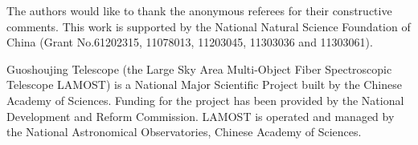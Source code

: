 \documentclass[manuscript]{aastex}
\begin{document}


\acknowledgments

The authors would like to thank the anonymous referees for their constructive comments.
This work is supported by the National Natural Science Foundation of China  (Grant No.61202315, 11078013, 11203045, 11303036 and 11303061).

 Guoshoujing Telescope  (the Large Sky Area Multi-Object Fiber Spectroscopic Telescope LAMOST) is a National Major Scientific Project built by the Chinese Academy of Sciences.
 Funding for the project has been provided by the National Development and Reform Commission.
 LAMOST is operated and managed by the National Astronomical Observatories, Chinese Academy of Sciences.




\end{document}
